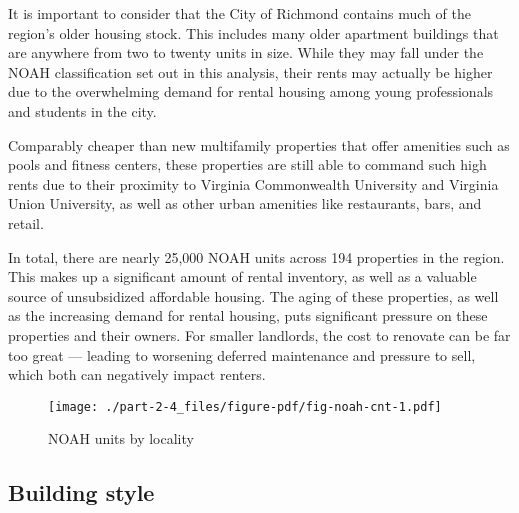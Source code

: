 \documentclass[
  letterpaper,
  DIV=11,
  numbers=noendperiod]{scrreprt}
\begin{document}
\begin{tcolorbox}[enhanced jigsaw, colframe=quarto-callout-caution-color-frame, arc=.35mm, bottomrule=.15mm, colbacktitle=quarto-callout-caution-color!10!white, opacityback=0, left=2mm, rightrule=.15mm, title=\textcolor{quarto-callout-caution-color}{\faFire}\hspace{0.5em}{Danger}, colback=white, coltitle=black, toptitle=1mm, leftrule=.75mm, titlerule=0mm, breakable, opacitybacktitle=0.6, toprule=.15mm, bottomtitle=1mm]

It is important to consider that the City of Richmond contains much of
the region's older housing stock. This includes many older apartment
buildings that are anywhere from two to twenty units in size. While they
may fall under the NOAH classification set out in this analysis, their
rents may actually be higher due to the overwhelming demand for rental
housing among young professionals and students in the city.

Comparably cheaper than new multifamily properties that offer amenities
such as pools and fitness centers, these properties are still able to
command such high rents due to their proximity to Virginia Commonwealth
University and Virginia Union University, as well as other urban
amenities like restaurants, bars, and retail.

\end{tcolorbox}

In total, there are nearly 25,000 NOAH units across 194 properties in
the region. This makes up a significant amount of rental inventory, as
well as a valuable source of unsubsidized affordable housing. The aging
of these properties, as well as the increasing demand for rental
housing, puts significant pressure on these properties and their owners.
For smaller landlords, the cost to renovate can be far too great ---
leading to worsening deferred maintenance and pressure to sell, which
both can negatively impact renters.

\begin{figure}

{\centering \texttt{[image: ./part-2-4\_files/figure-pdf/fig-noah-cnt-1.pdf]}

}

\caption{\label{fig-noah-cnt}NOAH units by locality}

\end{figure}

\hypertarget{building-style}{%
\subsection{Building style}\label{building-style}}
\end{document}
